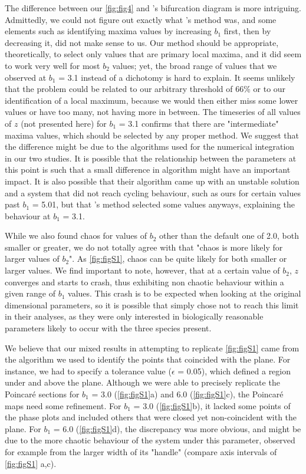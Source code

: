 The difference between our \autoref{fig:fig4} and \citeauthor{hastings1991}'s bifurcation diagram is more
intriguing. Admittedly, we could not figure out exactly what \citeauthor{hastings1991}'s method
was, and some elements such as identifying maxima values by increasing $b_1$ first, then
by decreasing it, did not make sense to us.
Our method should be appropriate, theoretically, to select only values that are primary
local maxima, and it did seem to work very well for most $b_2$ values;
yet, the broad range of values that we observed at $b_1$ = 3.1 instead of a dichotomy is
hard to explain.
It seems unlikely that the problem could be related to our arbitrary threshold of 66\% or
to our identification of a local maximum, because we would then either miss some lower
values or have too many, not having more in between.
The timeseries of all values of $z$ (not presented here) for $b_1$ = 3.1 confirms that
there are "intermediate" maxima values, which should be selected by any proper method.
We suggest that the difference might be due to the algorithms used for the numerical
integration in our two studies.
It is possible that the relationship between the parameters at this point is such that a
small difference in algorithm might have an important impact.
It is also possible that their algorithm came up with an unstable solution and a system
that did not reach cycling behaviour, such as ours for certain values past $b_1$ = 5.01,
but that \citeauthor{hastings1991}'s method selected some values anyways, explaining the behaviour
at $b_1$ = 3.1.

While we also found chaos for values of $b_2$ other than the default one of 2.0, both
smaller or greater, we do not totally agree with \citeauthor{hastings1991} that "chaos is more
likely for larger values of $b_2$". As \autoref{fig:figS1}, chaos can be quite likely for both
smaller or larger values.
We find important to note, however, that at a certain value of $b_2$, $z$ converges and
starts to crash, thus exhibiting non chaotic behaviour within a given range of $b_1$
values. This crash is to be expected when looking at the original dimensional parameters,
so it is possible that \citeauthor{hastings1991} simply chose not to reach this limit in their
analyses, as they were only interested in biologically reasonable parameters likely to
occur with the three species present.

We believe that our mixed results in attempting to replicate \autoref{fig:figS1} came from the
algorithm we used to identify the points that coincided with the plane.
For instance, we had to specify a tolerance value ($\epsilon$ = 0.05), which defined a region
under and above the plane.
Although we were able to precisely replicate the Poincaré sections for $b_1$ = 3.0
(\autoref{fig:figS1}a) and 6.0 (\autoref{fig:figS1}c), the Poincaré maps need some refinement.
For $b_1$ = 3.0 (\autoref{fig:figS1}b), it lacked some points of the phase plots and included
others that were closed yet non-coincident with the plane.
For $b_1$ = 6.0 (\autoref{fig:figS1}d), the discrepancy was more obvious, and might be due to the
more chaotic behaviour of the system under this parameter, observed for example from the
larger width of its "handle" (compare axis intervals of \autoref{fig:figS1} a,c).

